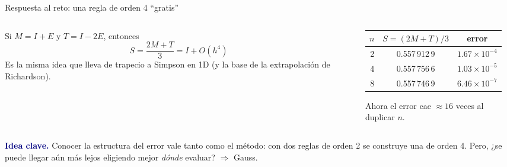 \documentclass[aspectratio=169,10pt]{beamer}
\newcommand{\ideaclave}[1]{\begin{clave}\small\textbf{\textcolor{navy}{Idea clave.}} #1\end{clave}}
\begin{document}
\begin{frame}{Respuesta al reto: una regla de orden 4 ``gratis''}
\begin{columns}[T]
\begin{column}{0.52\textwidth}
\small
Si $M=I+E$ y $T=I-2E$, entonces
\[
S=\frac{2M+T}{3}=I+O(h^4)
\]
Es la misma idea que lleva de trapecio a Simpson en 1D (y la base de la extrapolaci\'on de Richardson).
\end{column}
\begin{column}{0.44\textwidth}
\centering\small
\begin{tabular}{@{}rcc@{}}
\toprule
$n$ & $S=(2M+T)/3$ & error\\
\midrule
2 & 0.557\,912\,9 & $1.67\times10^{-4}$\\
4 & 0.557\,756\,6 & $1.03\times10^{-5}$\\
8 & 0.557\,746\,9 & $6.46\times10^{-7}$\\
\bottomrule
\end{tabular}
\par\smallskip\footnotesize Ahora el error cae $\approx16$ veces al duplicar $n$.
\end{column}
\end{columns}
\ideaclave{Conocer la \alert{estructura del error} vale tanto como el m\'etodo: con dos reglas de orden 2 se construye una de orden 4. Pero, ¿se puede llegar a\'un m\'as lejos eligiendo mejor \emph{d\'onde} evaluar? $\Rightarrow$ Gauss.}
\end{frame}

\end{document}
